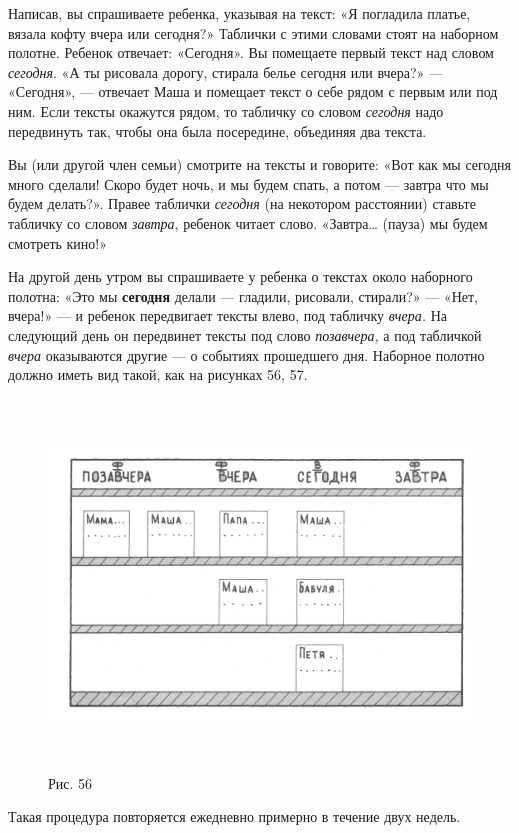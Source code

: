 \documentclass[a5paper]{book}
\renewcommand{\emph}[1]{\textit{#1}}
\begin{document}
Написав, вы спрашиваете ребенка, указывая на текст: «Я погладила платье,
вязала кофту вчера или сегодня?» Таблички с этими словами стоят на
наборном полотне. Ребенок отвечает: «Сегодня». Вы помещаете первый текст
над словом \emph{сегодня}. «А ты рисовала дорогу, стирала белье сегодня
или вчера?» --- «Сегодня», --- отвечает Маша и помещает текст о себе
рядом с первым или под ним. Если тексты окажутся рядом, то табличку со
словом \emph{сегодня} надо передвинуть так, чтобы она была посередине,
объединяя два текста.

Вы (или другой член семьи) смотрите на тексты и говорите: «Вот как мы
сегодня много сделали! Скоро будет ночь, и мы будем спать, а потом ---
завтра что мы будем делать?». Правее таблички \emph{сегодня} (на
некотором расстоянии) ставьте табличку со словом \emph{завтра}, ребенок
читает слово. «Завтра\ldots{} (пауза) мы будем смотреть кино!»

На другой день утром вы спрашиваете у ребенка о текстах около наборного
полотна: «Это мы \textbf{сегодня} делали --- гладили, рисовали,
стирали?» --- «Нет, вчера!» --- и ребенок передвигает тексты влево, под
табличку \emph{вчера.} На следующий день он передвинет тексты под слово
\emph{позавчера,} а под табличкой \emph{вчера} оказываются другие --- о
событиях прошедшего дня. Наборное полотно должно иметь вид такой, как на
рисунках 56, 57.

\begin{figure}
\centering
\includegraphics[width=5.87236in,height=3.85765in]{media/media/image53.jpg}
\caption*{Рис. 56}
\end{figure}


Такая процедура повторяется ежедневно примерно в течение двух недель.
\end{document}
